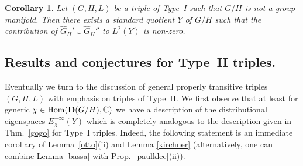 \documentclass[10]{amsart}
\newtheorem{cor}[thm]{Corollary}
\theoremstyle{remark}
\theoremstyle{definition}
\numberwithin{equation}{section}
\newcommand{\C}{\mathbb{C}}           %
\newcommand{\Hom}{\mathrm{Hom}}
\begin{document}
{\begin{cor}\label{nanunana}
Let $(G,H,L)$ be a triple of Type~I such that $G/H$ is not a group manifold. Then there exists  a standard quotient $Y$ of $G/H$ 
such that the contribution of $\widehat G_H'\cup \widehat G_H''$  to  $L^2(Y)$ is non-zero.
\end{cor}



\subsection{Results and conjectures for Type~II triples.}\label{TII} Eventually we turn to the discussion of general properly transitive triples $(G,H,L)$ with emphasis on triples of Type~II. We first observe that at least for generic $\chi\in\Hom({\bf D}(G/H),\C)$
we have a description of the distributional eigenspaces $E_\chi^{-\infty}(Y)$ which is completely analogous to the description given in Thm.~\ref{gogo} for Type~I triples.
Indeed, the following statement is an immediate corollary of Lemma~\ref{otto}(ii) and Lemma \ref{kirchner} (alternatively, one can combine Lemma \ref{bassa} with Prop.~\ref{paulklee}(ii)).

}
\end{document}
